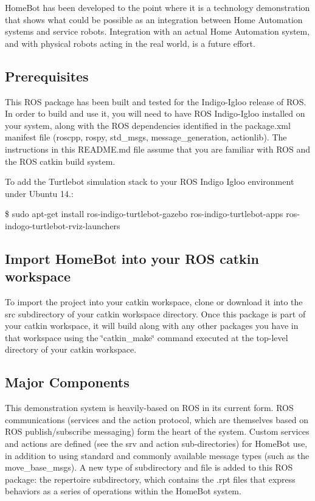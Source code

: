 Home\-Bot has been developed to the point where it is a technology demonstration that shows what could be possible as an integration between Home Automation systems and service robots. Integration with an actual Home Automation system, and with physical robots acting in the real world, is a future effort.

\subsection*{Prerequisites}

This R\-O\-S package has been built and tested for the Indigo-\/\-Igloo release of R\-O\-S. In order to build and use it, you will need to have R\-O\-S Indigo-\/\-Igloo installed on your system, along with the R\-O\-S dependencies identified in the package.\-xml manifest file (roscpp, rospy, std\-\_\-msgs, message\-\_\-generation, actionlib). The instructions in this R\-E\-A\-D\-M\-E.\-md file assume that you are familiar with R\-O\-S and the R\-O\-S catkin build system.

To add the Turtlebot simulation stack to your R\-O\-S Indigo Igloo environment under Ubuntu 14.\-:


\begin{DoxyItemize}
\item \$ sudo apt-\/get install ros-\/indigo-\/turtlebot-\/gazebo ros-\/indigo-\/turtlebot-\/apps ros-\/indogo-\/turtlebot-\/rviz-\/launchers
\end{DoxyItemize}

\subsection*{Import Home\-Bot into your R\-O\-S catkin workspace}

To import the project into your catkin workspace, clone or download it into the src subdirectory of your catkin workspace directory. Once this package is part of your catkin workspace, it will build along with any other packages you have in that workspace using the \char`\"{}catkin\-\_\-make\char`\"{} command executed at the top-\/level directory of your catkin workspace.

\subsection*{Major Components}

This demonstration system is heavily-\/based on R\-O\-S in its current form. R\-O\-S communications (services and the action protocol, which are themselves based on R\-O\-S publish/subscribe messaging) form the heart of the system. Custom services and actions are defined (see the srv and action sub-\/directories) for Home\-Bot use, in addition to using standard and commonly available message types (such as the move\-\_\-base\-\_\-msgs). A new type of subdirectory and file is added to this R\-O\-S package\-: the repertoire subdirectory, which contains the .rpt files that express behaviors as a series of operations within the Home\-Bot system.

